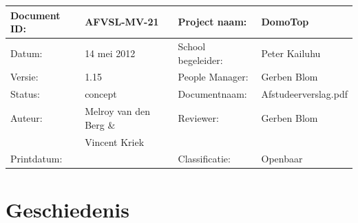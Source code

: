 \documentclass[]{article}
\makeatletter
\let\insertdate\@date
\newcommand{\version}{1.15}
\makeatother
\begin{document}
\vspace*{\fill}

\begin{tabular}{|| l | l || l | l ||}\hline
   Document ID: & AFVSL-MV-21          &Project naam:     &DomoTop             \\\hline
   Datum:       &14 mei 2012          &School begeleider:&Peter Kailuhu       \\\hline
   Versie:      &\version              &People Manager:   &Gerben Blom         \\\hline
   Status:      &concept               &Documentnaam:     &Afstudeerverslag.pdf\\\hline
   Auteur:      &Melroy van den Berg \&&Reviewer:         &Gerben Blom         \\
                &Vincent Kriek         &                  &                    \\\hline
   Printdatum:  &\insertdate           &Classificatie:    &Openbaar            \\\hline
\end{tabular}

\newpage
\thispagestyle{empty}
\section*{Geschiedenis}
\end{document}
